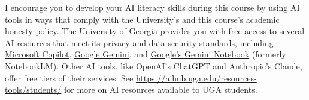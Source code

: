 I encourage you to develop your AI literacy skills during this course by using AI tools in ways that comply with the University's and this course's academic honesty policy. The University of Georgia provides you with free access to several AI resources that meet its privacy and data security standards, including \href{https://uga.teamdynamix.com/TDClient/3190/eitsclientportal/KB/Article/161202/Microsoft-Copilot-with-Commercial-Data-Protection}{Microsoft Copilot}, \href{https://uga.teamdynamix.com/TDClient/3190/eitsclientportal/KB/Article/167237/Gemini-with-Customer-Data-Protection}{Google Gemini}, and \href{https://uga.teamdynamix.com/TDClient/3190/eitsclientportal/KB/Article/167126/NotebookLM-with-Customer-Data-Protection}{Google's Gemini Notebook} (formerly NotebookLM). Other AI tools, like OpenAI's ChatGPT and Anthropic's Claude, offer free tiers of their services. See \href{https://aihub.uga.edu/resources-tools/students/}{https://aihub.uga.edu/resources-tools/students/} for more on AI resources available to UGA students.
